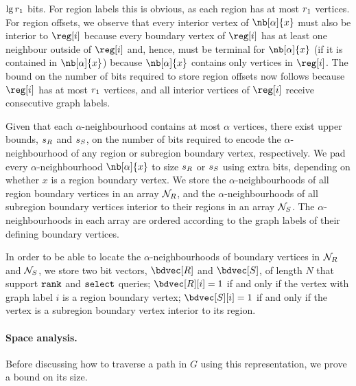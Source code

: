 {\begin{enumerate}
\begin{itemize}
    $\lg r_1$ bits.
    For region labels this is obvious, as each region has at most $r_1$
    vertices.
    For region offsets, we observe that every interior vertex of
    $\nb[\alpha]{x}$ must also be interior to $\reg[i]$ because every
    boundary vertex of $\reg[i]$ has at least one neighbour outside of
    $\reg[i]$ and, hence, must be terminal for $\nb[\alpha]{x}$ (if it is
    contained in $\nb[\alpha]{x}$) because $\nb[\alpha]{x}$ contains only
    vertices in $\reg[i]$.
    The bound on the number of bits required to store region offsets now
    follows because $\reg[i]$ has at most $r_1$ vertices, and all interior
    vertices of $\reg[i]$ receive consecutive graph labels.
  \end{itemize}
\end{enumerate}

Given that each $\alpha$-neighbourhood contains at most $\alpha$
vertices, there exist upper bounds, $s_R$ and $s_S$, on the number of
bits required to encode the $\alpha$-neighbourhood of any region or
subregion boundary vertex, respectively.
We pad every $\alpha$-neighbourhood $\nb[\alpha]{x}$ to size $s_R$ or
$s_S$ using extra bits, depending on whether $x$ is a region boundary
vertex.
We store the $\alpha$-neighbourhoods of all region boundary vertices in
an array $\mathcal{N}_R$, and the $\alpha$-neighbourhoods of all subregion boundary
vertices interior to their regions in an array $\mathcal{N}_S$.
The $\alpha$-neighbourhoods in each array are ordered according to the graph
labels of their defining boundary vertices.

In order to be able to locate the $\alpha$-neighbourhoods of boundary vertices
in $\mathcal{N}_R$ and $\mathcal{N}_S$, we store two bit vectors,
$\regbdvec$ and $\subregbdvec$, of length $N$ that support $\texttt{rank}$
and $\texttt{select}$ queries;
$\regbdvec[i] = 1$ if and only if the vertex with graph label $i$ is a region
boundary vertex; $\subregbdvec[i] = 1$ if and only if the vertex is a subregion
boundary vertex interior to its region.

\paragraph{Space analysis.}

Before discussing how to traverse a path in $G$ using this
representation, we prove a bound on its size.

}
